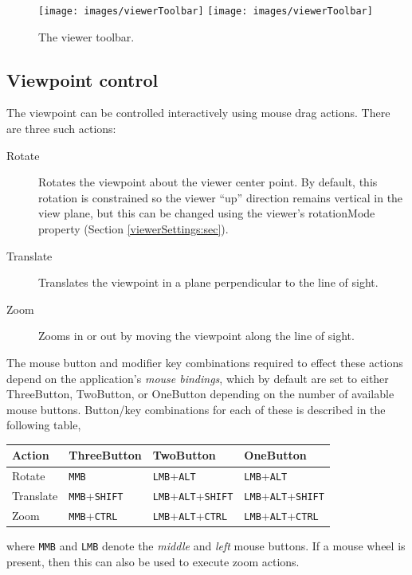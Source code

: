 \documentclass{article}
\begin{document}
\begin{figure}[h]
\begin{center}
\iflatexml
\texttt{[image: images/viewerToolbar]}
\else
\texttt{[image: images/viewerToolbar]}
\fi
\end{center}
\caption{The viewer toolbar.}%
\label{ViewerToolbarFig}
\end{figure}

\subsection{Viewpoint control}
\label{ViewpointControlSec}

The viewpoint can be controlled interactively using mouse drag
actions. There are three such actions:

\begin{description}

\item[Rotate] \mbox{}

Rotates the viewpoint about the viewer center point. By default, this
rotation is constrained so the viewer ``up'' direction remains
vertical in the view plane, but this can be changed using the viewer's
{\sf rotationMode} property (Section \ref{viewerSettings:sec}).

\item[Translate] \mbox{}

Translates the viewpoint in a plane perpendicular to the
line of sight.

\item[Zoom] \mbox{}

Zooms in or out by moving the viewpoint along the line of sight.

\end{description}

The mouse button and modifier key combinations required to effect
these actions depend on the application's {\it mouse bindings}, which
by default are set to either {\sf ThreeButton}, {\sf TwoButton}, or
{\sf OneButton} depending on the number of available mouse buttons.
Button/key combinations for each of these is described in the
following table,
%
\begin{center}
\begin{tabular}{|l|l|l|l|}
\hline
Action & {\sf ThreeButton} & {\sf TwoButton} & {\sf OneButton}\\
\hline
Rotate & 
{\tt MMB} & 
{\tt LMB}+{\tt ALT} & 
{\tt LMB}+{\tt ALT}\\
Translate & 
{\tt MMB}+{\tt SHIFT} & 
{\tt LMB}+{\tt ALT}+{\tt SHIFT} & 
{\tt LMB}+{\tt ALT}+{\tt SHIFT}\\
Zoom & 
{\tt MMB}+{\tt CTRL} & 
{\tt LMB}+{\tt ALT}+{\tt CTRL} & 
{\tt LMB}+{\tt ALT}+{\tt CTRL}\\
\hline
\end{tabular}
\end{center}
%
where {\tt MMB} and {\tt LMB} denote the {\it middle} and {\it left}
mouse buttons. If a mouse wheel is present, then this can also be used
to execute zoom actions.
\end{document}
